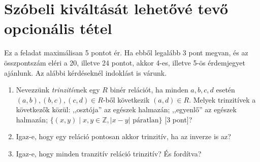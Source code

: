\documentclass[11pt,a4paper]{article}
\begin{document}
\section{Szóbeli kiváltását lehetővé tevő opcionális tétel}
Ez a feladat maximálisan 5 pontot ér. Ha ebből legalább 3 pont megvan, és az összpontszám eléri a 20, illetve 24 pontot, akkor 4-es, illetve 5-ös érdemjegyet ajánlunk. Az alábbi kérdéseknél indoklást is várunk.
\begin{enumerate}

\item Nevezzünk \emph{trinzitív}nek egy $R$ binér relációt, ha minden $a, b, c, d$ esetén $(a,b), (b,c), (c,d) \in R$-ből következik $(a,d)\in R$. Melyek trinzitívek a következők közül: ,,osztója'' az egészek halmazán; ,,egyenlő'' az egészek halmazán; $\{(x,y)\mid x, y\in\mathbb{Z}, |x-y| \textrm{ páratlan}\}$ [3 pont]?
\item Igaz-e, hogy egy reláció pontosan akkor trinzitív, ha az inverze is az?
\item Igaz-e, hogy minden tranzitív reláció trinzitív? És fordítva?


\end{enumerate}
\end{document}
